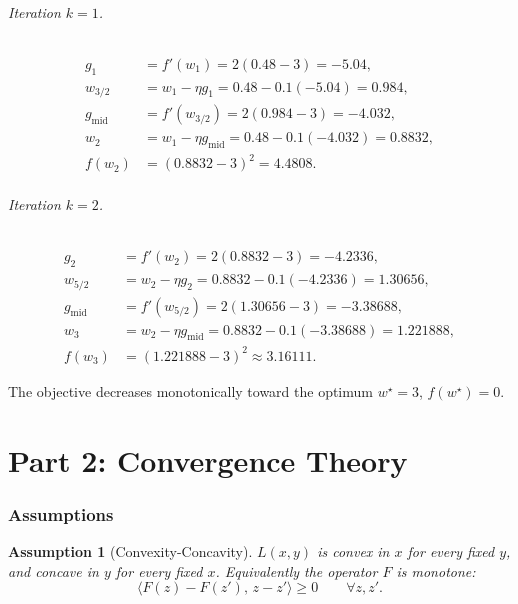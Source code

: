 \documentclass{article}
\newtheorem{assumption}{Assumption}
\begin{document}
\paragraph{Iteration $k=1$.}
\begin{align*}
g_1 &= f'(w_1) = 2(0.48-3) = -5.04,\\
w_{3/2} &= w_1 - \eta g_1 = 0.48 - 0.1(-5.04) = 0.984,\\
g_{\text{mid}} &= f'(w_{3/2}) = 2(0.984-3) = -4.032,\\
w_2 &= w_1 - \eta g_{\text{mid}} = 0.48 - 0.1(-4.032) = 0.8832,\\
f(w_2) &= (0.8832-3)^2 = 4.4808.
\end{align*}

\paragraph{Iteration $k=2$.}
\begin{align*}
g_2 &= f'(w_2) = 2(0.8832-3) = -4.2336,\\
w_{5/2} &= w_2 - \eta g_2 = 0.8832 - 0.1(-4.2336) = 1.30656,\\
g_{\text{mid}} &= f'(w_{5/2}) = 2(1.30656-3) = -3.38688,\\
w_3 &= w_2 - \eta g_{\text{mid}} = 0.8832 - 0.1(-3.38688) = 1.221888,\\
f(w_3) &= (1.221888-3)^2 \approx 3.16111.
\end{align*}

The objective decreases monotonically toward the optimum $w^\star=3$,
$f(w^\star)=0$.

\part*{Part 2: Convergence Theory}

\section*{Assumptions}

\begin{assumption}[Convexity-Concavity]
$L(x,y)$ is convex in $x$ for every fixed $y$, and concave in $y$ for
every fixed $x$. Equivalently the operator $F$ is \emph{monotone}:
\[
\langle F(z) - F(z'),\, z - z' \rangle \geq 0 \qquad \forall z,z'.
\]
\end{assumption}
\end{document}
